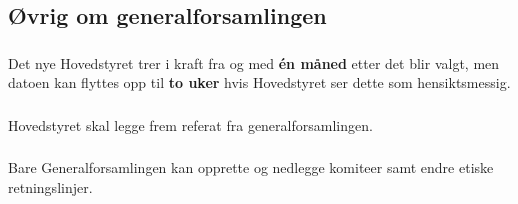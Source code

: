 \subsection{Øvrig om generalforsamlingen}
\subsubsection{}
Det nye Hovedstyret trer i kraft fra og med \textbf{én måned} etter det blir valgt,
men datoen kan flyttes opp til \textbf{to uker} hvis Hovedstyret ser dette som hensiktsmessig.

\subsubsection{}
Hovedstyret skal legge frem referat fra generalforsamlingen.

\subsubsection{}
Bare Generalforsamlingen kan opprette og nedlegge komiteer samt endre etiske retningslinjer.
